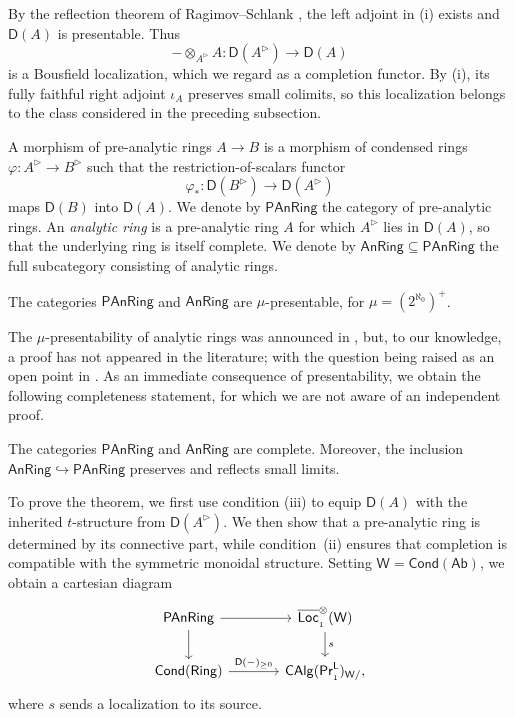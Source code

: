 By the reflection theorem of Ragimov--Schlank \cite[Thm.~1.1]{reflectionprinciple}, the left adjoint in (i) exists and $\mathsf{D}(A)$ is presentable. Thus
\[-\otimes_{A^\triangleright}A\colon\mathsf{D}(A^\triangleright)\to\mathsf{D}(A)\]
is a Bousfield localization, which we regard as a completion functor. By (i), its fully faithful right adjoint $\iota_A$ preserves small colimits, so this localization belongs to the class considered in the preceding subsection.

A morphism of pre-analytic rings $A\to B$ is a morphism of condensed rings $\varphi\colon A^\triangleright\to B^\triangleright$ such that the restriction-of-scalars functor
\[\varphi_*\colon\mathsf{D}(B^\triangleright)\to\mathsf{D}(A^\triangleright)\]
maps $\mathsf{D}(B)$ into $\mathsf{D}(A)$. We denote by $\mathsf{PAnRing}$ the category of pre-analytic rings. An \emph{analytic ring} is a pre-analytic ring $A$ for which $A^\triangleright$ lies in $\mathsf{D}(A)$, so that the underlying ring is itself complete. We denote by $\mathsf{AnRing}\subseteq\mathsf{PAnRing}$ the full subcategory consisting of analytic rings.

\begin{introthm}[\ref{PAnRing is presentable}, \ref{AnRing is presentable}]
The categories $\mathsf{PAnRing}$ and $\mathsf{AnRing}$ are $\mu$-presentable, for $\mu=(2^{\aleph_0})^+$.
\end{introthm}

The $\mu$-presentability of analytic rings was announced in \cite[Lecture~15]{ClausenScholzeAnalyticStacks}, but, to our knowledge, a proof has not appeared in the literature; with the question being raised as an open point in \cite[\S1.2, Footnote~2]{camargo2026notessolidgeometry}. As an immediate consequence of presentability, we obtain the following completeness statement, for which we are not aware of an independent proof.

\begin{introcor}[\ref{PAnRing is complete}, \ref{AnRing is complete}]
The categories $\mathsf{PAnRing}$ and $\mathsf{AnRing}$ are complete. Moreover, the inclusion $\mathsf{AnRing}\hookrightarrow\mathsf{PAnRing}$ preserves and reflects small limits. 
\end{introcor}

To prove the theorem, we first use condition (iii) to equip
$\mathsf{D}(A)$ with the inherited $t$-structure from $\mathsf{D}(A^\triangleright)$. We then show that a pre-analytic ring is determined by its connective part, while condition~(ii) ensures that completion is compatible with the symmetric monoidal structure. Setting $\mathsf{W}=\mathsf{Cond}(\mathsf{Ab})$, we obtain a cartesian diagram
\[
\begin{tikzcd}[column sep=large]
    {\mathsf{PAnRing}}
        & {\overline{\mathsf{Loc}}_{\aleph_1}^\otimes(\mathsf{W})} \\
    {\mathsf{Cond}(\mathsf{Ring})}
        & {\mathsf{CAlg}(\mathsf{Pr}^{\mathsf{L}}_{\aleph_1})_{\mathsf{W}/},}
    \arrow[from=1-1, to=1-2]
    \arrow[from=1-1, to=2-1]
    \arrow["s", from=1-2, to=2-2]
    \arrow["{\mathsf{D}(-)_{\geq0}}", from=2-1, to=2-2]
\end{tikzcd}
\]
where $s$ sends a localization to its source.

